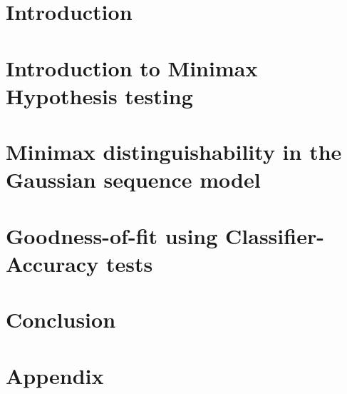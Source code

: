 \documentclass{report}
\date{\today}
\begin{document}
\hypersetup{pageanchor=false} 


\clearpage
\thispagestyle{empty}
\tableofcontents

\clearpage
\hypersetup{pageanchor=true} %
\setcounter{page}{1}

\chapter{Introduction}
\label{intro}


\chapter{Introduction to Minimax Hypothesis testing}
\label{chap2}


\chapter{Minimax distinguishability in the Gaussian sequence model}
\label{chap3}


\chapter{Goodness-of-fit using Classifier-Accuracy tests}
\label{chap4}


\chapter{Conclusion}
\label{conc}


\chapter*{Appendix}
\label{appendix}


\clearpage


\end{document}
